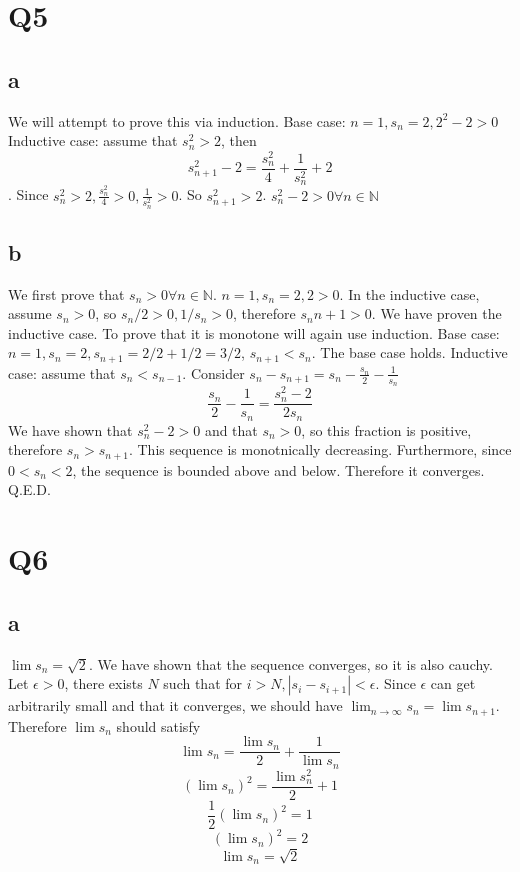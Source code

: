 \documentclass[12pt]{article}
\newcommand{\N}{\mathbb{N}}
\begin{document}
\section{Q5}
\subsection{a}
We will attempt to prove this via induction.
\newline
Base case: $n = 1, s_n = 2, 2^2-2 >0$
\newline
Inductive case: assume that $s_n^2>2$, then $$s_{n+1}^2-2 = \frac{s_n^2}{4} + \frac{1}{s_n^2} + 2$$. Since $s_n^2 > 2, \frac{s_n^2}{4}>0, \frac{1}{s_n^2}>0$. So $s_{n+1}^2 > 2$.
\newline
$s_n^2 -2> 0 \forall n \in \N$

\subsection{b}
We first prove that $s_n > 0 \forall n \in \N$. $n = 1, s_n = 2, 2>0$.
\newline
In the inductive case, assume $s_n > 0$, so $s_n/2 > 0, 1/s_n>0$, therefore $s_n{n+1}>0$. We have proven the inductive case.
\newline
To prove that it is monotone will again use induction.
\newline
Base case: $n = 1, s_n = 2, s_{n+1} = 2/2 + 1/2 = 3/2$, $s_{n+1}<s_n$. The base case holds.
\newline
Inductive case: assume that $s_n < s_{n-1}$. Consider $s_n-s_{n+1} = s_n - \frac{s_n}{2} - \frac{1}{s_n}$
$$\frac{s_n}{2} - \frac{1}{s_n} = \frac{s_n^2-2}{2s_n}$$
We have shown that $s_n^2 -2> 0 $ and that $s_n>0$, so this fraction is positive, therefore $s_n > s_{n+1}$. This sequence is monotnically decreasing.
\newline
Furthermore, since $0<s_n<2$, the sequence is bounded above and below. Therefore it converges. Q.E.D.
\newpage


\section{Q6}
\subsection{a}
$\lim s_n = \sqrt2$.
\newline
We have shown that the sequence converges, so it is also cauchy. Let $\epsilon > 0$, there exists $N$ such that for $ i> N, |s_i - s_{i+1}| < \epsilon$.
\newline
Since $\epsilon$ can get arbitrarily small and that it converges, we should have $\lim_{n \to \infty} s_n= \lim s_{n+1}$. Therefore $\lim s_n$ should satisfy $$\lim s_n = \frac{\lim s_n}{2}+ \frac{1}{\lim s_n}$$
$$(\lim s_n)^2 = \frac{\lim s_n^2}{2} + 1$$
$$\frac{1}{2}(\lim s_n)^2 = 1$$
$$(\lim s_n)^2 = 2$$
$$\lim s_n= \sqrt2$$
\end{document}

